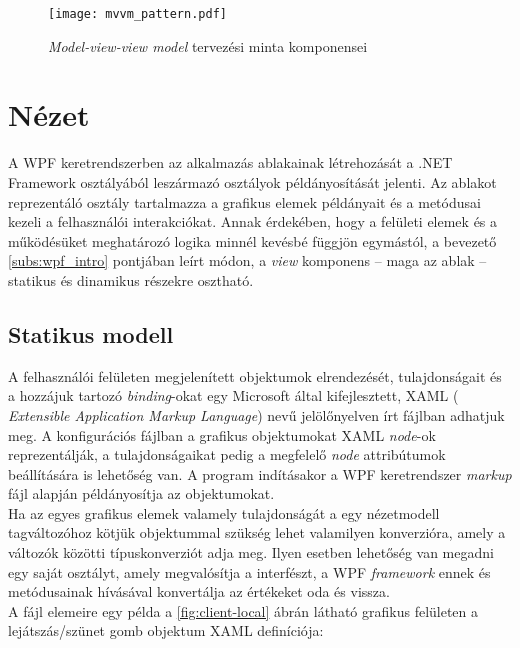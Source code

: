 \begin{figure}[h]
\vspace{.5cm}
\texttt{[image: mvvm\_pattern.pdf]}
\centering
\vspace{.2cm}
\caption{\emph{Model-view-view model} tervezési minta komponensei}
\vspace{.5cm}
\label{fig:mvvm_pattern}
\end{figure}

\section{Nézet}

A WPF keretrendszerben az alkalmazás ablakainak létrehozását a .NET Framework  osztályából leszármazó osztályok példányosítását jelenti. Az ablakot reprezentáló osztály tartalmazza a grafikus elemek példányait és a metódusai kezeli a felhasználói interakciókat. Annak érdekében, hogy a felületi elemek és a működésüket meghatározó logika minnél kevésbé függjön egymástól, a bevezető \ref{subs:wpf_intro} pontjában leírt módon, a \emph{view} komponens -- maga az ablak --  statikus és dinamikus részekre osztható.

\subsection{Statikus modell}

A felhasználói felületen megjelenített objektumok elrendezését, tulajdonságait és a hozzájuk tartozó \emph{binding}-okat egy Microsoft által kifejlesztett, XAML (\emph{ Extensible Application Markup Language}) nevű jelölőnyelven írt fájlban adhatjuk meg. A konfigurációs fájlban a grafikus objektumokat XAML \emph{node}-ok reprezentálják, a tulajdonságaikat pedig a megfelelő \emph{node} attribútumok beállítására is lehetőség van. A program indításakor a WPF keretrendszer \emph{markup} fájl alapján példányosítja az objektumokat.\\
Ha az egyes grafikus elemek valamely tulajdonságát a egy nézetmodell tagváltozóhoz kötjük  objektummal szükség lehet valamilyen konverzióra, amely a változók közötti típuskonverziót adja meg. Ilyen esetben lehetőség van megadni egy saját osztályt, amely megvalósítja a  interfészt, a WPF \emph{framework} ennek  és  metódusainak hívásával konvertálja az értékeket oda és vissza. \\
A fájl elemeire egy példa a \ref{fig:client-local} ábrán látható grafikus felületen a lejátszás/szünet gomb objektum XAML definíciója:

